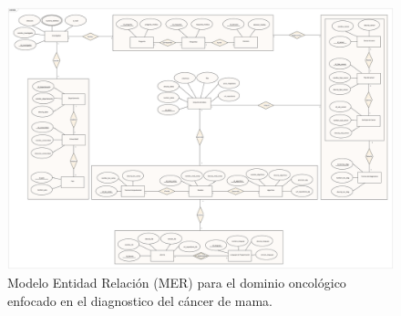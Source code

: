{}
\begin{landscape}
	\begin{figure}
		\centering
		\includegraphics[width=0.96
		\linewidth]{MER/IMAGENES_MER/0_MER_BCDL}
		\caption{Modelo Entidad Relación (MER) para el dominio oncológico enfocado en el diagnostico del cáncer de mama.}
		\label{MER}
	\end{figure}
\end{landscape}
\restoregeometry

